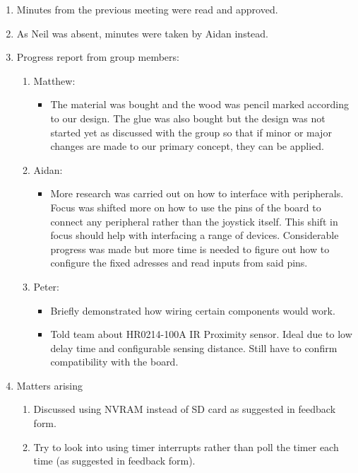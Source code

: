 \documentclass[11pt,a4paper]{article}
\begin{document}
\begin{enumerate}


\item Minutes from the previous meeting were read and approved.

\item As Neil was absent, minutes were taken by Aidan instead.

\item Progress report from group members:
   \begin{enumerate}
   \item Matthew:
	\begin{itemize}
		\item  The material was bought and the wood was pencil marked according to our design. The glue was also bought but the design was not started yet as discussed with the group so that if minor or major changes are made to our primary concept, they can be applied.
	\end{itemize}
   \item Aidan:
	\begin{itemize}
		\item More research was carried out on how to interface with peripherals. Focus was shifted more on how to use the pins of the board to connect any peripheral rather than the joystick itself. This shift in focus should help with interfacing a range of devices. Considerable progress was made but more time is needed to figure out how to configure the fixed adresses and read inputs from said pins.
	\end{itemize}
\item Peter:
	\begin{itemize}
		\item Briefly demonstrated how wiring certain components would work.
		\item Told team about HR0214-100A IR Proximity sensor. Ideal due to low delay time and configurable sensing distance. Still have to confirm compatibility with the board.
	\end{itemize}

   \end{enumerate}


\item Matters arising
   \begin{enumerate}
   	\item Discussed using NVRAM instead of SD card as suggested in feedback form.
	\item Try to look into using timer interrupts rather than poll the timer each time (as suggested in feedback form).
   \end{enumerate}

\end{enumerate}
\end{document}
